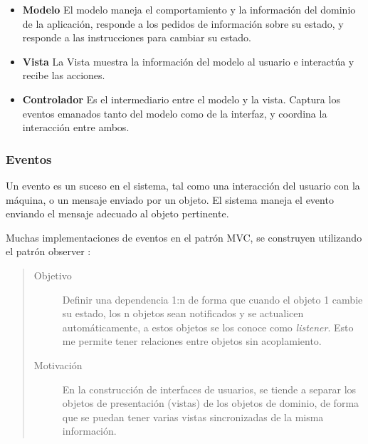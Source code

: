 	\begin {itemize}
	
		\item {\bf Modelo}
			El modelo maneja el comportamiento y la información del dominio de la
			aplicación, responde a los pedidos de información sobre su estado, 
			y responde a las instrucciones para cambiar su estado. 
			
			
		\item {\bf Vista}
			La Vista muestra la información del modelo al usuario e interactúa y recibe
			las acciones.
			
		\item {\bf Controlador}
			Es el intermediario entre el modelo y la vista.
			Captura los eventos emanados tanto del modelo como de la interfaz, y coordina
			la interacción entre ambos.
			
	
	\end {itemize}

\subsubsection{Eventos}
\label{sec:Eventos}

Un evento es un suceso en el sistema, tal como una interacción del usuario con
la máquina, o un mensaje enviado por un objeto.  
El sistema maneja el evento enviando el mensaje adecuado al objeto pertinente. 

Muchas implementaciones de eventos en el patrón MVC, se construyen utilizando el
patrón observer \cite{Gamma1995}:

\begin{quote}

\begin{description}
   
\item [Objetivo] Definir una dependencia 1:n de forma que cuando el objeto
	1 cambie su estado, los n objetos sean notificados y se actualicen
	automáticamente, a estos objetos se los conoce como \emph{listener}. Esto me
	permite tener relaciones entre objetos sin acoplamiento.

\item [Motivación] En la construcción de interfaces de usuarios, se tiende
	a separar los objetos de presentación (vistas) de los objetos de dominio, de
	forma que se puedan tener varias vistas sincronizadas de la misma información.

\end{description}
\end{quote}

